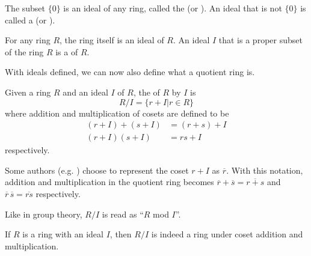 \begin{example}
    The subset $\{0\}$ is an ideal of any ring, called the  (or ). An ideal that is not $\{0\}$ is called a  (or ).
\end{example}
\begin{example}
    For any ring $R$, the ring itself is an ideal of $R$. An ideal $I$ that is a proper subset of the ring $R$ is a  of $R$.
\end{example}

With ideals defined, we can now also define what a quotient ring is.

\begin{definition}
    Given a ring $R$ and an ideal $I$ of $R$, the  of $R$ by $I$ is
    \[
        R/I = \{r + I \vert r \in R\}
    \]
    where addition and multiplication of cosets are defined to be
    \begin{align*}
        (r+I)+(s+I) &= (r+s) + I\\
        (r+I)(s+I) &= rs + I
    \end{align*}
    respectively.
\end{definition}
\begin{remark}
    Some authors (e.g. \cite[p.~243]{dummit_foote_2004}) choose to represent the coset $r + I$ as $\overline{r}$. With this notation, addition and multiplication in the quotient ring becomes $\overline{r}+\overline{s} = \overline{r+s}$ and $\overline{r}\,\overline{s} = \overline{rs}$ respectively.
\end{remark}
\begin{remark}
    Like in group theory, $R/I$ is read as ``$R$ mod $I$''.
\end{remark}

\begin{proposition}
    If $R$ is a ring with an ideal $I$, then $R/I$ is indeed a ring under coset addition and multiplication.
\end{proposition}

\newpage


